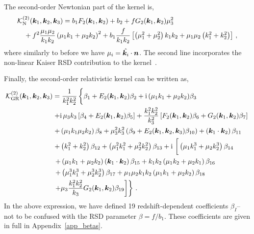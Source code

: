 The second-order Newtonian part of the kernel is,
\begin{align}
	&\mathcal{K}_{\mathrm{N}}^{(2)}(\bm {k}_1,\bm {k}_2,\bm {k}_3) = b_1 F_2(\bm {k}_1,\bm {k}_2) + b_2 + f G_2 (\bm {k}_1,\bm {k}_2) \mu_3^2 \nonumber \\
	&\quad+f^2 \frac{\mu_1 \mu_2}{k_1 k_2} \left( \mu_1 k_1 + \mu_2 k_2 \right)^2 + b_1 \frac{f}{k_1 k_2} \left[ \left( \mu_1^2 + \mu_2^2 \right)k_1 k_2 + \mu_1 \mu_2 \left( k_1^2 + k_2^2 \right) \right]\,,
\end{align}
where similarly to before we have $\mu_i = \hat{\bm {k}_i}\cdot\bm {n}$. The second line incorporates the non-linear Kaiser RSD contribution to the kernel~\cite{Verde:1999ij,Scoccimarro:1999ed}. 

Finally, the second-order relativistic kernel can be written as, 
\begin{align}
	\ko_\mathrm{GR}^{(2)}(\ka,\kb,\kc) &= \frac{1}{k_1^2 k_2^2} \left\{ \vphantom{\frac{k_1^2 k_2^2}{k_3}} \beta_1 + E_2(\ka,\kb) \beta_2 +\i (\mu_1k_1+\mu_2k_2)\beta_3 \right. \nonumber \\
&\left. + \i \mu_3 k_3\left[ \beta_{4} + E_2(\ka, \kb)\beta_{5}\right] +\frac{k_1^2 k_2^2}{k_3^2} \left[ F_2(\ka,\kb) \beta_{6} + G_2(\ka,\kb) \beta_{7} \right]\right. \nonumber \\
&\left.  + \left( \mu_1 k_1 \mu_2 k_2 \right)\beta_{8} + \mu_3^2 k_3^2 \left(\beta_{9} + E_2(\ka,\kb,\kc) \beta_{10} \right)  + \left(\ka \cdot \kb \right)\beta_{11} \right. \nonumber \\
&\left. + \left( k_1^2 + k_2^2 \right) \beta_{12} + \left( \mu_1^2 k_1^2 + \mu_2^2 k_2^2 \right) \beta_{13} + \i \left[\vphantom{\frac{k_1^2 k_2^2}{k_3}} \left( \mu_1 k_1^3 + \mu_2 k_2^3 \right)\beta_{14} \right. \right. \nonumber \\
&\left. \left. + \left( \mu_1 k_1 + \mu_2 k_2 \right) \left(\ka\cdot\kb \right) \beta_{15} + k_1 k_2 \left(\mu_1 k_2 + \mu_2 k_1 \right) \beta_{16} \right. \right. \nonumber \\
& \left. \left. + \left( \mu_1^3 k_1^3 + \mu_2^3 k_2^3 \right)\beta_{17} + \mu_1 \mu_2 k_1 k_2 \left( \mu_1 k_1 + \mu_2 k_2 \right) \beta_{18} \right. \right. \nonumber \\
& \left. \left. + \mu_3 \frac{k_1^2 k_2^2}{k_3} G_2(\ka,\kb) \beta_{19} \right] \right\}\,.
\end{align}
In the above expression, we have defined 19 redshift-dependent coefficients $\beta_I$-- not to be confused with the RSD parameter $\beta = f / b_1$. These coefficients are given in full in Appendix~\ref{app_betas}. 

